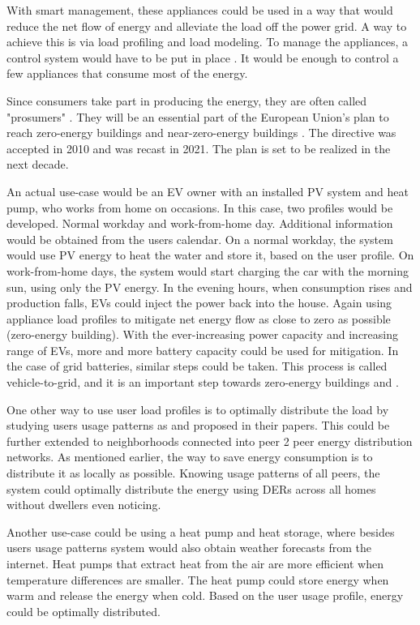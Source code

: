 With smart management, these appliances could be used in a way that would reduce the net flow of energy and alleviate the load off the power grid.
A way to achieve this is via load profiling and load modeling. 
To manage the appliances, a control system would have to be put in place \cite{DirectLoadControll2021}.
It would be enough to control a few appliances that consume most of the energy. 

Since consumers take part in producing the energy, they are often called "prosumers" \cite{Prosumer2016}.
They will be an essential part of the European Union's plan to reach zero-energy buildings
and near-zero-energy buildings \cite{eu2021}. The directive was accepted in 2010 and was recast in 2021.
The plan is set to be realized in the next decade.

An actual use-case would be an EV owner with an installed PV system and heat pump, who works from home on occasions.
In this case, two profiles would be developed. Normal workday and work-from-home day.
Additional information would be obtained from the users calendar. 
On a normal workday, the system would use PV energy to heat the water and store it, based on the user profile.
On work-from-home days, the system would start charging the car with the morning sun, using only the PV energy. 
In the evening hours, when consumption rises and production falls, EVs could inject the power back into the house. 
Again using appliance load profiles to mitigate net energy flow as close to zero as possible (zero-energy building).
With the ever-increasing power capacity and increasing range of EVs, more and more battery capacity could be used for mitigation. 
In the case of grid batteries, similar steps could be taken.
This process is called vehicle-to-grid, and it is an important step towards zero-energy buildings \cite{EV2018} and \cite{EV2020}.

One other way to use user load profiles is to optimally distribute the load by studying users usage patterns as \cite{Chuan2014} and \cite{shift2015} proposed in their papers. 
This could be further extended to neighborhoods connected into peer 2 peer energy distribution networks.
As mentioned earlier, the way to save energy consumption is to distribute it as locally as possible. 
Knowing usage patterns of all peers, the system could optimally distribute the energy using DERs across all homes without dwellers even noticing.

Another use-case could be using a heat pump and heat storage,
where besides users usage patterns system would also obtain weather forecasts from the internet.
Heat pumps that extract heat from the air are more efficient when temperature differences are smaller. 
The heat pump could store energy when warm and release the energy when cold.
Based on the user usage profile, energy could be optimally distributed.

